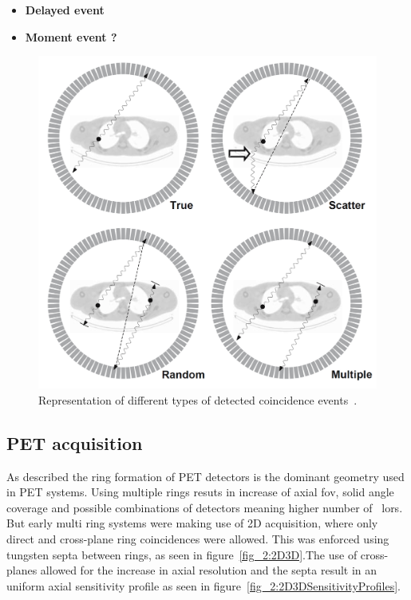 \begin{itemize}
\item\textbf{Delayed event}\\

\item\textbf{Moment event ?}\\


\end{itemize}
%
\begin{figure} [h!]
\centering
\includegraphics[scale=0.22,angle=0]{2_Theory_Methods/figures/Bailey_Scatter_Random_events.png}
\caption{Representation of different types of detected coincidence events~\cite{Bailey2005}. } 
\label{fig_2:EventsIlustration}
\end{figure} 
%
%
\subsection{PET acquisition}
As described the ring formation of PET detectors is the dominant geometry used in PET systems. Using multiple rings resuts in increase of axial \gls{fov}, solid angle coverage and possible combinations of detectors meaning higher number of ~\glspl{lor}. But early multi ring systems were making use of 2D acquisition, where only direct and cross-plane ring coincidences were allowed. 
This was enforced using tungsten septa between rings, as seen in figure~\ref{fig_2:2D3D}.The use of cross-planes allowed for the increase in axial resolution and the septa result in an uniform axial sensitivity profile as seen in figure~\ref{fig_2:2D3DSensitivityProfiles}. 

